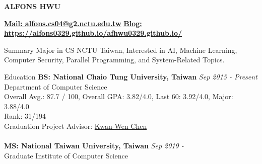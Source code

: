 \documentclass{resume} %
\begin{document}
\begin{center}
    {\huge\textbf{ALFONS HWU}}
\end{center}

{\bf \url{Mail: alfons.cs04@g2.nctu.edu.tw}} \hfill {\bf \url{Blog: https://alfons0329.github.io/afhwu0329.github.io/}}
\\
\begin{rSection}{Summary}
Major in CS NCTU Taiwan, Interested in AI, Machine Learning, Computer Security, Parallel Programming, and System-Related Topics.
\end{rSection}


\begin{rSection}{Education}
{\bf BS: National Chaio Tung University, Taiwan} \hfill {\em Sep 2015 - Present} 
\\ Department of Computer Science  
\\ Overall Avg.: 87.7 / 100, Overall GPA: 3.82/4.0, Last 60: 3.92/4.0, Major: 3.88/4.0
\\ Rank: 31/194
\\ Graduation Project Advisor: \href{https://www.cs.nctu.edu.tw/members/detail/kuanwen}{Kwan-Wen Chen} 
\\
\\
{\bf MS: National Taiwan University, Taiwan} \hfill {\em Sep 2019 - }
\\ Graduate Institute of Computer Science
\end{rSection}

\end{document}
